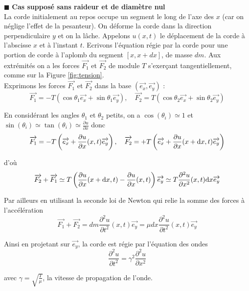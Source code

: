 \documentclass[a4,12pt]{article}
\begin{document}
\indent $\blacksquare$ \textbf{Cas supposé sans raideur et de diamètre nul}\\

La corde initialement au repos occupe un segment le long de l'axe des $x$ (car on néglige l'effet de la pesanteur). On déforme la corde dans la direction perpendiculaire $y$ et on la lâche. Appelons $u(x,t)$ le déplacement de la corde à l'abscisse $x$ et à l'instant $t$. Ecrivons l'équation régie par la corde pour une portion de corde à l'aplomb du segment $[x,x +dx]$, de masse $dm$. Aux extrémités on a les forces $\vec{F_1}$ et $\vec{F_2}$ de module $T$ s'exerçant tangentiellement, comme sur la Figure \ref{fig:tension}.\\

Exprimons les forces $\vec{F_1}$ et $\vec{F_2}$ dans la base $(\vec{e_x},\vec{e_y})$ : 
\[ 
\overrightarrow{F_1} = - T (\cos \theta_1 \overrightarrow{e_x} + \sin \theta_1 \overrightarrow{e_y}), \quad \overrightarrow{F_2} = T (\cos \theta_2 \overrightarrow{e_x} + \sin \theta_2 \overrightarrow{e_y})
\]
 
En considérant les angles $\theta_1$ et $\theta_2$ petits, on a $\cos(\theta_i)\simeq 1$ et $\sin(\theta_i)\simeq \tan(\theta_i)\simeq \frac{\partial u}{\partial x}$ donc 
\[
\overrightarrow{F_1} = - T \left(\overrightarrow{e_x} + {\partial u \over \partial x} (x,t) \overrightarrow{e_y}\right), \quad 
\overrightarrow{F_2} = + T \left(\overrightarrow{e_x} + {\partial u \over \partial x} (x+\mathrm dx,t)\overrightarrow{e_y}\right)
\]

d'où 
\[ 
\overrightarrow{F_2} + \overrightarrow{F_1} \simeq 
T \left( {\partial u \over \partial x} (x+\mathrm dx,t) - {\partial u \over \partial x} (x,t)\right) \overrightarrow{e_y}\simeq 
T {\partial ^2 u \over \partial x^2 } (x,t) \mathrm d x \overrightarrow{e_y}
\]
 
Par ailleurs en utilisant la seconde loi de Newton qui relie la somme des forces à l'accélération  
\[ 
\vec{F_1}+\vec{F_2}=dm\frac{\partial ^2u}{\partial t^2}(x,t)\vec{e_y}=\mu dx\frac{\partial ^2u}{\partial t^2}(x,t)\vec{e_y}
\]
 
Ainsi en projetant sur $\vec{e_y}$, la corde est régie par l'équation des ondes 
\begin{equation}
	\frac{\partial ^2u}{\partial t^2}=\gamma^2\frac{\partial ^2u}{\partial x^2}
	\label{eq:ondes}
\end{equation}

avec $\gamma=\sqrt{\frac{T}{\mu}}$, la vitesse de propagation de l'onde.\\
\end{document}
